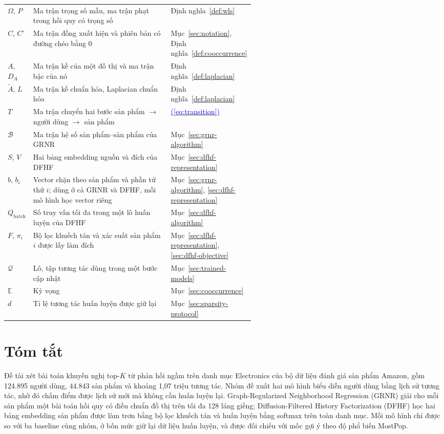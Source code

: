 \documentclass[12pt,a4paper]{article}
\theoremstyle{plain} %
\renewcommand{\eqref}[1]{%
    \hyperref[#1]{\textcolor{blue}{\textup{(\ref*{#1})}}}%
}
\theoremstyle{plain} %
\theoremstyle{plain} %
\theoremstyle{nonumberplain}  %
\numberwithin{equation}{section}
\numberwithin{figure}{section}
\numberwithin{table}{section}
\begin{document}
\begin{longtable}{@{}l>{\raggedright\arraybackslash}p{0.56\linewidth}l@{}}
$\Omega$, $P$ & Ma trận trọng số mẫu, ma trận phạt trong hồi quy có trọng số & Định nghĩa~\ref{def:wls} \\
$C$, $C^\circ$ & Ma trận đồng xuất hiện và phiên bản có đường chéo bằng 0 & Mục~\ref{sec:notation}, Định nghĩa~\ref{def:cooccurrence} \\
$A$, $D_A$ & Ma trận kề của một đồ thị và ma trận bậc của nó & Định nghĩa~\ref{def:laplacian} \\
$\tilde A$, $L$ & Ma trận kề chuẩn hóa, Laplacian chuẩn hóa & Định nghĩa~\ref{def:laplacian} \\
$T$ & Ma trận chuyển hai bước sản phẩm $\to$ người dùng $\to$ sản phẩm & \eqref{eq:transition} \\
$\mathcal{B}$ & Ma trận hệ số sản phẩm--sản phẩm của GRNR & Mục~\ref{sec:grnr-algorithm} \\
$S$, $V$ & Hai bảng embedding nguồn và đích của DFHF & Mục~\ref{sec:dfhf-representation} \\
$b$, $b_i$ & Vector chặn theo sản phẩm và phần tử thứ $i$; dùng ở cả GRNR và DFHF, mỗi mô hình học vector riêng & Mục~\ref{sec:grnr-algorithm}, \ref{sec:dfhf-representation} \\
$Q_{\mathrm{batch}}$ & Số truy vấn tối đa trong một lô huấn luyện của DFHF & Mục~\ref{sec:dfhf-algorithm} \\
$F$, $\pi_i$ & Bộ lọc khuếch tán và xác suất sản phẩm $i$ được lấy làm đích & Mục~\ref{sec:dfhf-representation}, \ref{sec:dfhf-objective} \\
$\mathcal{Q}$ & Lô, tập tương tác dùng trong một bước cập nhật & Mục~\ref{sec:trained-models} \\
$\mathbb{E}$ & Kỳ vọng & Mục~\ref{sec:cooccurrence} \\
$d$ & Tỉ lệ tương tác huấn luyện được giữ lại & Mục~\ref{sec:sparsity-protocol} \\
\bottomrule
\end{longtable}
\endgroup

\clearpage
\section*{\centering Tóm tắt}
Đề tài xét bài toán khuyến nghị top-$K$ từ phản hồi ngầm trên danh mục Electronics của bộ dữ liệu đánh giá sản phẩm Amazon, gồm 124.895 người dùng, 44.843 sản phẩm và khoảng 1,07 triệu tương tác. Nhóm đề xuất hai mô hình biểu diễn người dùng bằng lịch sử tương tác, nhờ đó chấm điểm được lịch sử mới mà không cần huấn luyện lại. Graph-Regularized Neighborhood Regression (GRNR) giải cho mỗi sản phẩm một bài toán hồi quy có điều chuẩn đồ thị trên tối đa 128 láng giềng; Diffusion-Filtered History Factorization (DFHF) học hai bảng embedding sản phẩm được làm trơn bằng bộ lọc khuếch tán và huấn luyện bằng softmax trên toàn danh mục. Mỗi mô hình chỉ được so với ba baseline cùng nhóm, ở bốn mức giữ lại dữ liệu huấn luyện, và được đối chiếu với mốc gợi ý theo độ phổ biến MostPop.
\end{document}
